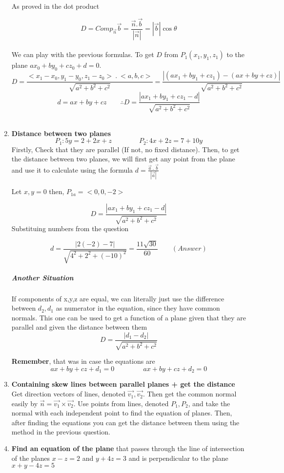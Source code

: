 \documentclass{article}
\begin{document}
\begin{enumerate}[1.]
			As proved in the dot product 

			\[
				D = Comp_{ \vec{ n } } \vec{ b } 			= \frac{ \vec{ n } . \vec{ b } }{ | \vec{ n }| } = | \vec{ b } | \cos{ \theta } 
			\]
			\\ 
			We can play with the previous formulas. To get $D$ from $P_1(x_1,y_1,z_1)$ to the plane $ax_0+by_0+cz_0+d=0$.
			\[
				D = \frac{ <x_1-x_0, y_1-y_0, z_1-z_0>\ .\ <a,b,c> }{ \sqrt{a^2+b^2+c^2}}=  \frac{ |(ax_1+by_1+cz_1)-(ax+by+cz)| }{ \sqrt{a^2+b^2+c^2} }
			\]
			\[
				d = ax+by+cz \qquad	\therefore D = \frac{ |ax_1+by_1+cz_1-d| }{ \sqrt{a^2+b^2+c^2} }
			\]
			\\

		\item \textbf{Distance between two planes}
			\[
				P_1:5y=2+2x+z \qquad \qquad P_2:4x+2z=7+10y
			\]
			Firstly, Check that they are parallel (If not, no fixed distance). Then, to get the distance between two planes, we will first get any point from the plane and use it to calculate using the formula $ d = \frac{ \vec{ a }\ .\ \vec{ b } }{ | \vec{ a } | } $

			Let $x,y=0$ then, $P_{1a} = <0,0,-2>$

			\[
				D =  \frac{ |ax_1+by_1+cz_1-d| }{ \sqrt{a^2+b^2+c^2} }
			\]
			Substituing numbers from the question

			\[
				d = \frac{ |2(-2)-7| }{ \sqrt{4^2+2^2+(-10)^2} } = \frac{ 11 \sqrt{ 30 } }{ 60 }\qquad (Answer)
			\]
			\subparagraph{Another Situation}
			If components of x,y,z are equal, we can literally just use the difference between $d_2, d_1$ as numerator in the equation, since they have common normals. This one can be used to get a function of a plane given that they are parallel and given the distance between them
			\[
				D = \frac{ |d_1-d_2| }{ \sqrt{a^2+b^2+c^2} } 
			\]

			\textbf{Remember}, that was in case the equations are
			\[ ax + by + cz + d_1 = 0\ \qquad \qquad  ax + by + cz + d_2 = 0 \]
		\item \textbf{Containing skew lines between parallel planes + get the distance}
			Get direction vectors of lines, denoted $ \vec{ v_1 }, \vec{ v_2} $. Then get the common normal easily by $ \vec{ n }= \vec{ v_1 } \times \vec{ v_2 }$. Use points from lines, denoted $P_1, P_2$, and take the normal with each independent point to find the equation of planes. Then, after finding the equations you can get the distance between them using the method in the previous question.

		\item \textbf{Find an equation of the plane} that passes through the line of intersection of the planes $x - z = 2$ and $y + 4z = 3$ and is perpendicular to the plane $x+y-4z=5$


\end{enumerate}
\end{document}
